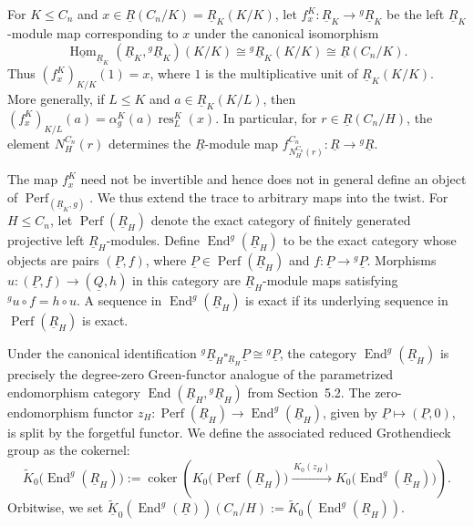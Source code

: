 \documentclass[11pt,oneside]{amsart}
\DeclareMathOperator{\Hom}{Hom}
\DeclareMathOperator{\res}{res}
\DeclareMathOperator{\Perf}{Perf}
\DeclareMathOperator{\End}{End}
\DeclareMathOperator{\coker}{coker}
\numberwithin{equation}{section}
\numberwithin{figure}{section}
\theoremstyle{plain}
\theoremstyle{definition}
\theoremstyle{remark}
\begin{document}
For \(K\leq C_n\) and \(x\in\underline R(C_n/K)=\underline R_K(K/K)\), let \(f_x^K\colon\underline R_K\to{}^g\underline R_K\) be the left $\underline R_K$-module map corresponding to \(x\) under the canonical isomorphism
\begin{equation*}
\underline{\Hom}_{\underline R_K}(\underline R_K,{}^g\underline R_K)(K/K)
\cong
{}^g\underline R_K(K/K)
\cong
\underline R(C_n/K).
\end{equation*}
Thus \((f_x^K)_{K/K}(1)=x\), where \(1\) is the multiplicative unit of \(\underline R_K(K/K)\). More generally, if \(L\leq K\) and \(a\in\underline R_K(K/L)\), then \((f_x^K)_{K/L}(a) = \alpha_g^K(a)\res_L^K(x)\).  In particular, for
\(r\in\underline R(C_n/H)\), the element \(N_H^{C_n}(r)\) determines
the \(\underline R\)-module map
\(
f_{N_H^{C_n}(r)}^{C_n}\colon
\underline R\to{}^g\underline R.
\)
 

The map \(f_x^K\) need not be invertible and hence does not in general define an object of \(\Perf_{(\underline R_K,g)}\). We thus extend the trace to arbitrary maps into the twist. For $H\leq C_n$, let $\Perf(\underline R_H)$ denote the exact category of finitely generated projective left $\underline R_H$-modules. Define $\End^g(\underline R_H)$ to be the exact category whose objects are pairs $(\underline P,f)$, where $\underline P\in\Perf(\underline R_H)$ and $f\colon\underline P\to{}^g\underline P$. Morphisms $u\colon(\underline P,f)\to(\underline Q,h)$ in this category are $\underline R_H$-module maps satisfying ${}^g u\circ f=h\circ u$. A sequence in $\End^g(\underline R_H)$ is exact if its underlying sequence in $\Perf(\underline R_H)$ is exact. 

Under the canonical identification ${}^g\underline R_H \square_{\underline R_H}\underline P \cong {}^g\underline P$, the category $\End^g(\underline R_H)$ is precisely the degree-zero Green-functor analogue of the parametrized endomorphism category $\End(\underline R_H,{}^g\underline R_H)$ from Section~5.2. The zero-endomorphism functor \(z_H\colon \Perf(\underline R_H)\to\End^g(\underline R_H)\), given by \(\underline P\mapsto(\underline P,0)\), is split by the forgetful functor. We define the associated reduced Grothendieck group as the cokernel:
\begin{equation*}
\widetilde K_0\bigl(\End^g(\underline R_H)\bigr)
:=
\coker\!\left(
K_0\bigl(\Perf(\underline R_H)\bigr)
\xrightarrow{\,K_0(z_H)\,}
K_0\bigl(\End^g(\underline R_H)\bigr)
\right).
\end{equation*}
Orbitwise, we set \(\widetilde{\underline K}_0(\End^g(\underline R))(C_n/H) := \widetilde K_0(\End^g(\underline R_H))\).
\end{document}
